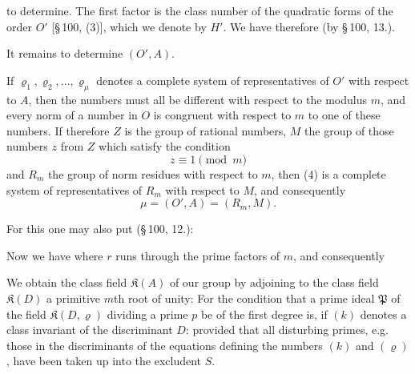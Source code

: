 
to determine. The first factor is the class number of the quadratic forms of the order $O'$ [\S\,100, (3)], which we denote by $H'$. We have therefore
(by \S\,100, 13.).

It remains to determine $(O', A)$.

If $\varrho_1, \varrho_2, \dots, \varrho_\mu$ denotes a complete system of representatives of $O'$ with respect to $A$, then the numbers
must all be different with respect to the modulus $m$, and every norm of a number in $O$ is congruent with respect to $m$ to one of these numbers. If therefore $Z$ is the group of rational numbers, $M$ the group of those numbers $z$ from $Z$ which satisfy the condition
\[
z \equiv 1 \pmod{m}
\]
and $R_m$ the group of norm residues with respect to $m$, then (4) is a complete system of representatives of $R_m$ with respect to $M$, and consequently
\[
\mu = (O', A) = (R_m, M).
\]

For this one may also put (\S\,100, 12.):

Now we have
where $r$ runs through the prime factors of $m$, and consequently

We obtain the class field $\mathfrak{K}(A)$ of our group by adjoining to the class field $\mathfrak{K}(D)$ a primitive $m$th root of unity:
For the condition that a prime ideal $\mathfrak{P}$ of the field $\mathfrak{K}(D,\varrho)$ dividing a prime $p$ be of the first degree is, if $(k)$ denotes a class invariant of the discriminant $D$:
provided that all disturbing primes, e.g. those in the discriminants of the equations defining the numbers $(k)$ and $(\varrho)$, have been taken up into the excludent $S$.
